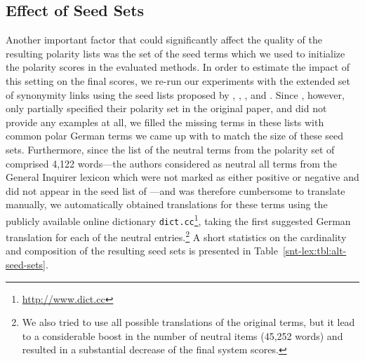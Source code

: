 \subsection{Effect of Seed Sets}

Another important factor that could significantly affect the quality
of the resulting polarity lists was the set of the seed terms which we
used to initialize the polarity scores in the evaluated methods.  In
order to estimate the impact of this setting on the final scores, we
re-run our experiments with the extended set of synonymity links using
the seed lists proposed by \citet{Hu:04}, \citet{Kim:04},
\citet{Esuli:06c}, and \citet{Remus:10}.  Since \citet{Hu:04},
however, only partially specified their polarity set in the original
paper, and \citet{Kim:04} did not provide any examples at all, we
filled the missing terms in these lists with common polar German terms
we came up with to match the size of these seed sets.  Furthermore,
since the list of the neutral terms from the polarity set of
\citet{Esuli:06c} comprised 4,122 words---the authors considered as
neutral all terms from the General Inquirer lexicon \cite{Stone:66}
which were not marked as either positive or negative and did not
appear in the seed list of \citet{Turney:03}---and was therefore
cumbersome to translate manually, we automatically obtained
translations for these terms using the publicly available online
dictionary \texttt{dict.cc}\footnote{\url{http://www.dict.cc}}, taking
the first suggested German translation for each of the neutral
entries.\footnote{We also tried to use all possible translations of
  the original terms, but it lead to a considerable boost in the
  number of neutral items (45,252 words) and resulted in a substantial
  decrease of the final system scores.} A short statistics on the
cardinality and composition of the resulting seed sets is presented in
Table~\ref{snt-lex:tbl:alt-seed-sets}.

